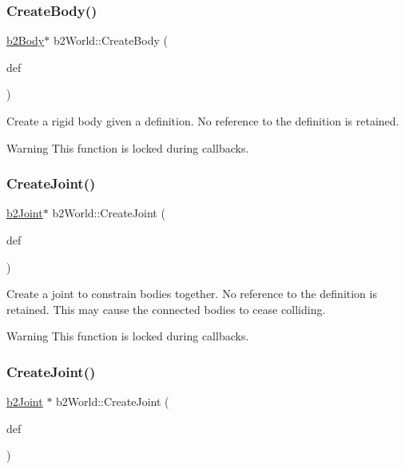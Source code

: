\subsubsection{\texorpdfstring{Create\+Body()}{CreateBody()}\hspace{0.1cm}{\footnotesize\ttfamily [2/2]}}
{\footnotesize\ttfamily \hyperlink{classb2Body}{b2\+Body}$\ast$ b2\+World\+::\+Create\+Body (\begin{DoxyParamCaption}\item[{const \hyperlink{structb2BodyDef}{b2\+Body\+Def} $\ast$}]{def }\end{DoxyParamCaption})}

Create a rigid body given a definition. No reference to the definition is retained. \begin{DoxyWarning}{Warning}
This function is locked during callbacks. 
\end{DoxyWarning}
\mbox{\label{classb2World_a8a408c367fe133530f3e577c667d1efd}} 
\subsubsection{\texorpdfstring{Create\+Joint()}{CreateJoint()}\hspace{0.1cm}{\footnotesize\ttfamily [1/2]}}
{\footnotesize\ttfamily \hyperlink{classb2Joint}{b2\+Joint}$\ast$ b2\+World\+::\+Create\+Joint (\begin{DoxyParamCaption}\item[{const \hyperlink{structb2JointDef}{b2\+Joint\+Def} $\ast$}]{def }\end{DoxyParamCaption})}

Create a joint to constrain bodies together. No reference to the definition is retained. This may cause the connected bodies to cease colliding. \begin{DoxyWarning}{Warning}
This function is locked during callbacks. 
\end{DoxyWarning}
\mbox{\label{classb2World_a5cba9d0653149eb62504154e6fb35021}} 
\subsubsection{\texorpdfstring{Create\+Joint()}{CreateJoint()}\hspace{0.1cm}{\footnotesize\ttfamily [2/2]}}
{\footnotesize\ttfamily \hyperlink{classb2Joint}{b2\+Joint} $\ast$ b2\+World\+::\+Create\+Joint (\begin{DoxyParamCaption}\item[{const \hyperlink{structb2JointDef}{b2\+Joint\+Def} $\ast$}]{def }\end{DoxyParamCaption})}

